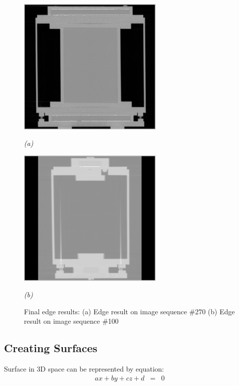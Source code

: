 \begin{figure}[htb]
  \begin{minipage}[b]{2.75in}
    \centering
    \centerline{\mbox{\includegraphics[width=2.75in]{data_extraction/images/sample/20121017_270/Coronal/result.eps}}}
    \centerline{\emph{(a)}}
  \end{minipage}
  \begin{minipage}[b]{2.75in}
    \centering
    \centerline{\mbox{\includegraphics[width=2.75in]{data_extraction/images/sample/20121017_100/Coronal/result_canny_[0_001,0_002].eps}}}
    \centerline{\emph{(b)}}
  \end{minipage}
  \caption{Final edge results: (a) Edge result on image sequence \#270 (b) Edge result on image sequence \#100}
  \label{fig:coronal_edge_final_result}
\end{figure}


\subsection{Creating Surfaces}

Surface in 3D space can be represented by equation:
\begin{eqnarray}
ax + by + cz + d & = & 0 \label{eq:plane}
\end{eqnarray}

